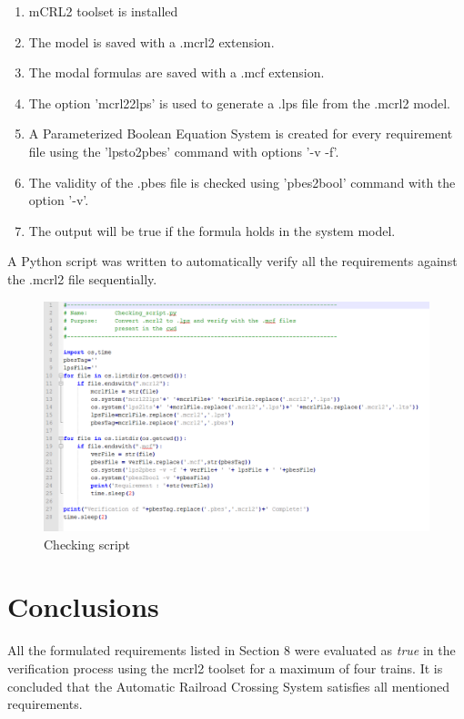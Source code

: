 \documentclass[10pt,a4paper]{article}
\begin{document}
\begin{enumerate} 
\item mCRL2 toolset is installed
\item The model is saved with a .mcrl2 extension.
\item The modal formulas are saved with a .mcf extension.
\item The option 'mcrl22lps' is used to generate a .lps file from the .mcrl2 model.
\item A Parameterized Boolean Equation System is created for every requirement file using the 'lpsto2pbes' command with options '-v -f'.
\item The validity of the .pbes file is checked using 'pbes2bool' command with the option '-v'.
\item The output will be true if the formula holds in the system model.
\end{enumerate}
A Python script was written to automatically verify all the requirements against the .mcrl2 file sequentially.

   \begin{figure}[thpb]
      \centering
      \includegraphics[scale=0.4]{Check_script.PNG}
      \caption{Checking script}
   \end{figure}


\section{Conclusions}

All the formulated requirements listed in Section 8 were evaluated as \emph{true} in the verification process using the mcrl2 toolset for a maximum of four trains. It is concluded that the Automatic Railroad Crossing System satisfies all mentioned requirements.
\end{document}
